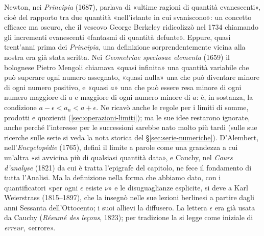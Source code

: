 \begin{notastorica}
Newton, nei \emph{Principia} (1687), parlava di «ultime ragioni di quantità
evanescenti», cioè del rapporto tra due quantità «nell'istante in cui svaniscono»: un
concetto efficace ma oscuro, che il vescovo George Berkeley ridicolizzò nel 1734
chiamando gli incrementi evanescenti «fantasmi di quantità defunte». Eppure, quasi
trent'anni prima dei \emph{Principia}, una definizione sorprendentemente vicina alla
nostra era già stata scritta. Nei \emph{Geometriae speciosae elementa} (1659) il
bolognese Pietro Mengoli chiamava «quasi infinita» una quantità variabile che può
superare ogni numero assegnato, «quasi nulla» una che può diventare minore di ogni
numero positivo, e «quasi $a$» una che può essere resa minore di ogni numero maggiore di
$a$ e maggiore di ogni numero minore di $a$: è, in sostanza, la condizione
$a-\epsilon<a_{n}<a+\epsilon$. Ne ricavò anche le regole per i limiti di somme, prodotti e
quozienti (\cref{sec:operazioni-limiti}); ma le sue idee restarono ignorate, anche perché
l'interesse per le successioni sarebbe nato molto più tardi (sulle sue ricerche sulle
serie si veda la nota storica del \S\ref{sec:serie-numeriche}). D'Alembert,
nell'\emph{Encyclopédie} (1765), definì il limite a parole come una grandezza a cui un'altra «si avvicina più di
qualsiasi quantità data», e Cauchy, nel \emph{Cours d'analyse} (1821) da cui è tratta
l'epigrafe del capitolo, ne fece il fondamento di tutta l'Analisi. Ma la definizione nella
forma che abbiamo dato, con i quantificatori «per ogni $\epsilon$ esiste $\nu$» e le
disuguaglianze esplicite, si deve a Karl Weierstrass (1815--1897), che la insegnò nelle
sue lezioni berlinesi a partire dagli anni Sessanta dell'Ottocento; i suoi allievi la
diffusero. La lettera $\epsilon$ era già usata da Cauchy (\emph{Résumé des leçons}, 1823); per
tradizione la si legge come iniziale di \emph{erreur}, «errore».
\end{notastorica}
